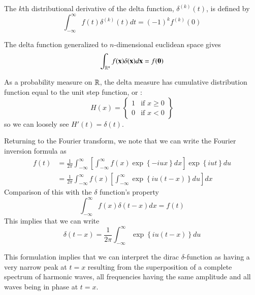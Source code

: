 \documentclass[12pt, a4paper, oneside, openright, titlepage]{book}
\begin{document}
\begin{prop}
    The $k$th distributional derivative of the delta function, $\delta^{(k)}(t)$, is defined by \begin{equation*}
        \int_{-\infty}^{\infty}f(t)\delta^{(k)}(t)dt = (-1)^kf^{(k)}(0)
    \end{equation*}
\end{prop}

\begin{defn}
    The delta function generalized to $n$-dimensional euclidean space gives \begin{equation*}
        \int_{\mathbb R^n}f(\mathbf{x})\delta(\mathbf{x})d\mathbf{x} = f(\mathbf{0})
    \end{equation*}
\end{defn}

As a probability measure on $\mathbb R$, the delta measure has cumulative distribution function equal to the unit step function, or : \begin{equation*}
    H(x) = \left\{\begin{array}{lc} 1 & \text{if } x \geq 0 \\ 0 & \text{if } x < 0 \end{array}\right\}
\end{equation*}
so we can loosely see $H'(t) = \delta(t)$.

Returning to the Fourier transform, we note that we can write the Fourier inversion formula as \begin{align*}
    f(t) &= \frac{1}{2\pi}\int_{-\infty}^{\infty}\left[\int_{-\infty}^{\infty}f(x)\exp\left\{-iux\right\}dx\right]\exp\left\{iut\right\}du \\
    &= \frac{1}{2\pi}\int_{-\infty}^{\infty}f(x)\left[\int_{-\infty}^{\infty}\exp\left\{iu(t-x)\right\}du\right]dx 
\end{align*}
Comparison of this with the $\delta$ function's property \begin{equation*}
    \int_{-\infty}^{\infty}f(x)\delta(t-x)dx = f(t)
\end{equation*}
This implies that we can write \begin{equation}
    \boxed{\delta(t-x) = \frac{1}{2\pi}\int_{-\infty}^{\infty}\exp\left\{iu(t-x)\right\}du}
\end{equation}

This formulation implies that we can interpret the dirac $\delta$-function as having a very narrow peak at $t = x$ resulting from the superposition of a complete spectrum of harmonic waves, all frequencies having the same amplitude and all waves being in phase at $t = x$.
\end{document}
